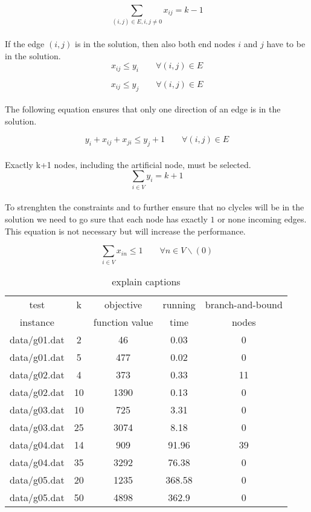 \begin{equation}
  \sum_{(i, j) \in E, i,j \neq 0}  x_{ij} = k-1
\end{equation}
\\
If the edge $(i,j)$ is in the solution, then also both end nodes $i$ and $j$ 
have to be in the solution.
\begin{equation}
  x_{ij} \leq y_{i} \qquad \forall (i,j) \in E
  \label{lbl:xy1}
\end{equation}

\begin{equation}
  x_{ij} \leq y_{j} \qquad \forall (i,j) \in E
  \label{lbl:xy2}
\end{equation}
\\
The following equation ensures that only one direction of an edge is in the solution.

\begin{equation}
 y_{i} + x_{ij} + x_{ji} \leq y_{j} + 1 \qquad \forall (i,j) \in E
 \label{lbl:xy3}
\end{equation}
\\
Exactly k+1 nodes, including the artificial node, must be selected.
\begin{equation}
  \sum_{i \in V} y_i = k + 1
  \label{lbl:yk}
\end{equation}
\\
To strenghten the constraints and to further ensure that no clycles will be in the solution we need to go sure that each node has exactly $1$ or none incoming edges. This equation is not necessary but will increase the performance.

\begin{equation}
  \sum_{i \in V} {x_{in}} \leq 1 \qquad \forall n \in V \backslash (0)
\end{equation}


\begin{table} 
\small
\centering
\begin{tabular}{ccccc}
\hline
test     & k & objective      & running & branch-and-bound \\
instance &   & function value & time    & nodes \\
\hline
data/g01.dat		& 2	& 46	& 0.03	& 0	\\ 
data/g01.dat		& 5	& 477	& 0.02	& 0	\\ 
data/g02.dat		& 4	& 373	& 0.33	& 11	\\ 
data/g02.dat		& 10	& 1390	& 0.13	& 0	\\ 
data/g03.dat		& 10	& 725	& 3.31	& 0	\\ 
data/g03.dat		& 25	& 3074	& 8.18	& 0	\\ 
data/g04.dat		& 14	& 909	& 91.96	& 39	\\ 
data/g04.dat		& 35	& 3292	& 76.38	& 0	\\ 
data/g05.dat		& 20	& 1235	& 368.58	& 0	\\ 
data/g05.dat		& 50	& 4898	& 362.9	& 0	\\ 

\hline
\end{tabular}
\caption{explain captions}
\label{tbl:scf_fast}
\end{table}
